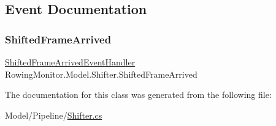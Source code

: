 \subsection{Event Documentation}
\mbox{\label{class_rowing_monitor_1_1_model_1_1_shifter_af95fddf9149c4aa965a6365180954cf7}} 
\subsubsection{\texorpdfstring{Shifted\+Frame\+Arrived}{ShiftedFrameArrived}}
{\footnotesize\ttfamily \hyperlink{class_rowing_monitor_1_1_model_1_1_shifter_a094227f56757ab924211af7a74d0e205}{Shifted\+Frame\+Arrived\+Event\+Handler} Rowing\+Monitor.\+Model.\+Shifter.\+Shifted\+Frame\+Arrived}



The documentation for this class was generated from the following file\+:\begin{DoxyCompactItemize}
\item 
Model/\+Pipeline/\hyperlink{_shifter_8cs}{Shifter.\+cs}\end{DoxyCompactItemize}
